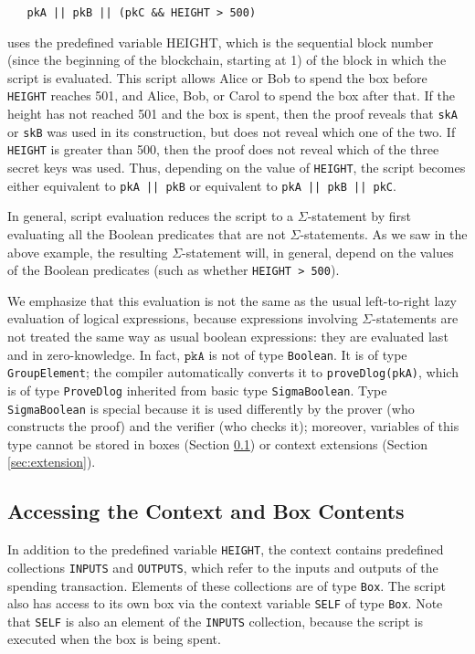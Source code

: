 \documentclass[11pt]{article}
\begin{document}
\begin{verbatim}
   pkA || pkB || (pkC && HEIGHT > 500)
\end{verbatim}
uses the predefined variable HEIGHT, which is the sequential block number (since the beginning of the blockchain, starting at 1)
of the block in which the script is evaluated.
This script allows Alice or Bob to spend the box before \texttt{HEIGHT} reaches 501, and Alice, Bob, or Carol to spend the box after that. If the height has not reached 501 and the box is spent, then the proof reveals that \texttt{skA} or \texttt{skB} was used in its construction, but does not reveal which one of the two. If \texttt{HEIGHT} is greater than 500, then the proof does not reveal which of the three secret keys was used. Thus, depending on the value of \texttt{HEIGHT}, the script becomes either equivalent to \texttt{pkA || pkB} or equivalent to \texttt{pkA || pkB || pkC}.

In general, script evaluation reduces the script to a $\Sigma$-statement by first evaluating all the Boolean predicates that are not $\Sigma$-statements. As we saw in the above example, the resulting $\Sigma$-statement will, in general, depend on the values of the Boolean predicates (such as whether \texttt{HEIGHT > 500}).

We emphasize that this evaluation is not the same as the usual left-to-right lazy evaluation of logical expressions, because expressions involving $\Sigma$-statements are not treated the same way as usual boolean expressions: they are evaluated last and in zero-knowledge. In fact, $\texttt{pkA}$ is not of type \texttt{Boolean}. It is of type \texttt{GroupElement}; the compiler automatically converts it to \texttt{proveDlog(\texttt{pkA})}, which is of type \texttt{ProveDlog} inherited from basic type \texttt{SigmaBoolean}. Type   \texttt{SigmaBoolean} is special because it is used differently by the prover (who constructs the proof) and the verifier (who checks it); moreover, variables of this type cannot be stored in boxes (Section \ref{sec:context}) or context extensions (Section \ref{sec:extension}).


\subsection{Accessing the Context and Box Contents}
\label{sec:context}
In addition to the predefined variable \texttt{HEIGHT}, the context contains predefined collections \texttt{INPUTS} and \texttt{OUTPUTS}, which refer to the inputs and outputs of the spending transaction. Elements of these collections are of type \texttt{Box}. The script also has access to its own box via the context variable \texttt{SELF} of type \texttt{Box}. Note that \texttt{SELF} is also an element of the \texttt{INPUTS} collection, because the script is executed when the box is being spent.
\end{document}
